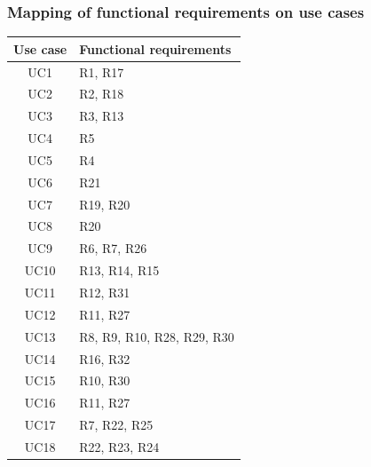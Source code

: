 \subsubsection*{Mapping of functional requirements on use cases}
\begin{center}
    \def\arraystretch{1.5}
    \begin{longtable}[H]{|c|l|}
        \hline
        \textbf{Use case} & \textbf{Functional requirements} \\ \hline
        UC1               & R1, R17                          \\ \hline
        UC2               & R2, R18                          \\ \hline
        UC3               & R3, R13                          \\ \hline
        UC4               & R5                               \\ \hline
        UC5               & R4                               \\ \hline
        UC6               & R21                              \\ \hline
        UC7               & R19, R20                         \\ \hline
        UC8               & R20                              \\ \hline
        UC9               & R6, R7, R26                      \\ \hline
        UC10              & R13, R14, R15                    \\ \hline
        UC11              & R12, R31                         \\ \hline
        UC12              & R11, R27                         \\ \hline
        UC13              & R8, R9, R10, R28, R29, R30       \\ \hline
        UC14              & R16, R32                         \\ \hline
        UC15              & R10, R30                         \\ \hline
        UC16              & R11, R27                         \\ \hline
        UC17              & R7, R22, R25                     \\ \hline
        UC18              & R22, R23, R24                    \\ \hline
    \end{longtable}
\end{center}

